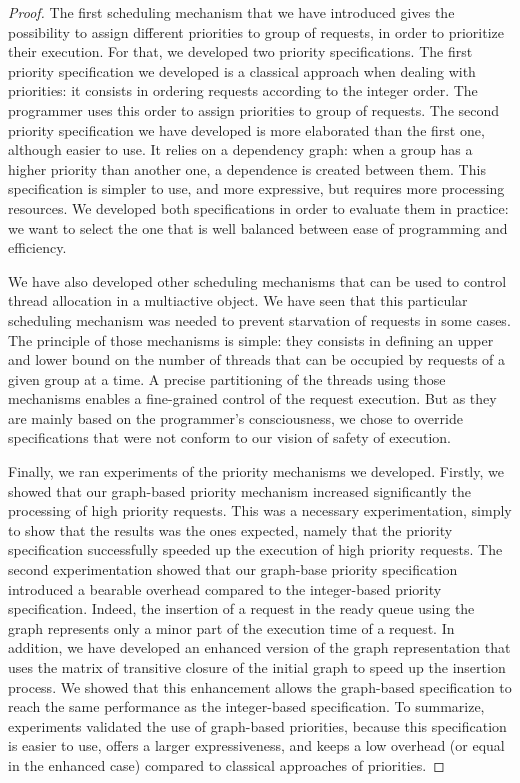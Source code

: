 \documentclass[11pt]{report}
\begin{document}
\begin{proof}
The first scheduling mechanism that we have introduced gives the possibility to assign different priorities to group of requests, in order to prioritize their execution. For that, we developed two priority specifications. The first priority specification we developed is a classical approach when dealing with priorities: it consists in ordering requests according to the integer order. The programmer uses this order to assign priorities to group of requests. The second priority specification we have developed is more elaborated than the first one, although easier to use. It relies on a dependency graph: when a group has a higher priority than another one, a dependence is created between them. This specification is simpler to use, and more expressive, but requires more processing resources. We developed both specifications in order to evaluate them in practice: we want to select the one that is well balanced between ease of programming and efficiency.

We have also developed other scheduling mechanisms that can be used to control thread allocation in a multiactive object. We have seen that this particular scheduling mechanism was needed to prevent starvation of requests in some cases. The principle of those mechanisms is simple: they consists in defining an upper and lower bound on the number of threads that can be occupied by requests of a given group at a time. A precise partitioning of the threads using those mechanisms enables a fine-grained control of the request execution. But as they are mainly based on the programmer's consciousness, we chose to override specifications that were not conform to our vision of safety of execution.

Finally, we ran experiments of the priority mechanisms we developed. Firstly, we showed that our graph-based priority mechanism increased significantly the processing of high priority requests. This was a necessary experimentation, simply to show that the results was the ones expected, namely that the priority specification successfully speeded up the execution of high priority requests. The second experimentation showed that our graph-base priority specification introduced a bearable overhead compared to the integer-based priority specification. Indeed, the insertion of a request in the ready queue using the graph represents only a minor part of the execution time of a request. In addition, we have developed an enhanced version of the graph representation that uses the matrix of transitive closure of the initial graph to speed up the insertion process. We showed that this enhancement allows the graph-based specification to reach the same performance as the integer-based specification. To summarize, experiments validated the use of graph-based priorities, because this specification is easier to use, offers a larger expressiveness, and keeps a low overhead (or equal in the enhanced case) compared to classical approaches of priorities. 



\end{proof}
\end{document}

